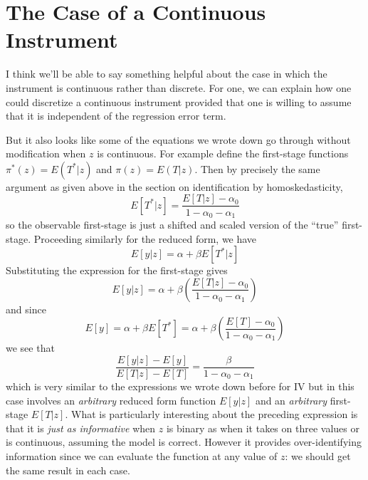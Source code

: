 \section{The Case of a Continuous Instrument} 
I think we'll be able to say something helpful about the case in which the instrument is continuous rather than discrete.
For one, we can explain how one could discretize a continuous instrument provided that one is willing to assume that it is independent of the regression error term.

But it also looks like some of the equations we wrote down go through without modification when $z$ is continuous.
For example define the first-stage functions $\pi^*(z) = E(T^*|z)$ and $\pi(z) = E(T|z)$.
Then by precisely the same argument as given above in the section on identification by homoskedasticity,
\begin{equation}
  E[T^*|z] = \frac{E[T|z] - \alpha_0}{1 - \alpha_0 - \alpha_1}
\end{equation}
so the observable first-stage is just a shifted and scaled version of the ``true'' first-stage.
Proceeding similarly for the reduced form, we have 
\begin{equation}
  E[y|z] =  \alpha + \beta E[T^*|z]
\end{equation}
Substituting the expression for the first-stage gives
\begin{equation}
  E[y|z] = \alpha + \beta \left( \frac{E[T|z]- \alpha_0}{1 - \alpha_0 - \alpha_1} \right) 
\end{equation}
and since 
\begin{equation}
  E[y] = \alpha + \beta E[T^*] = \alpha + \beta \left( \frac{E[T] - \alpha_0}{1 - \alpha_0 - \alpha_1} \right)
\end{equation}
we see that
\begin{equation}
  \frac{E[y|z] - E[y]}{E[T|z] - E[T]} = \frac{\beta}{1 - \alpha_0 - \alpha_1}
\end{equation}
which is very similar to the expressions we wrote down before for IV but in this case involves an \emph{arbitrary} reduced form function $E[y|z]$ and an \emph{arbitrary} first-stage $E[T|z]$.
What is particularly interesting about the preceding expression is that it is \emph{just as informative} when $z$ is binary as when it takes on three values or is continuous, assuming the model is correct.
However it provides over-identifying information since we can evaluate the function at any value of $z$: we should get the same result in each case.

